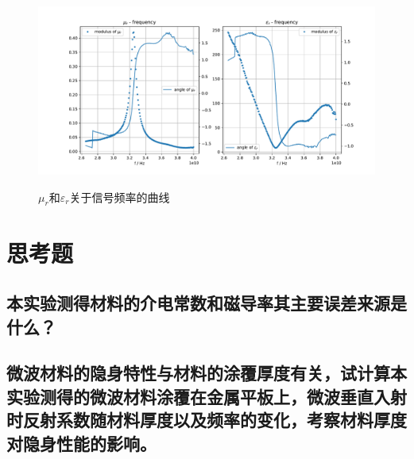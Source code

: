 \documentclass[a4paper]{article}
\begin{document}
\begin{figure}[!h]
\centering
\includegraphics[width=12cm]{fig/final.pdf}\\
\caption{$\mu_r$和$\varepsilon_r$关于信号频率的曲线}\label{final}
\end{figure}

\section{思考题}
\subsection{本实验测得材料的介电常数和磁导率其主要误差来源是什么？}
\subsection{微波材料的隐身特性与材料的涂覆厚度有关，试计算本实验测得的微波材料涂覆在金属平板上，微波垂直入射时反射系数随材料厚度以及频率的变化，考察材料厚度对隐身性能的影响。}

\nocite{jiaocai}

\end{document}
